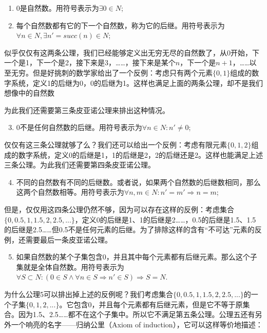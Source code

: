 \documentclass[UTF8]{article}
\begin{document}
\begin{enumerate}
\item 0是自然数。用符号表示为$\exists 0 \in N$;
\item 每个自然数都有它的下一个自然数，称为它的后继。用符号表示为$\forall n \in N, \exists n' = succ(n) \in N$;
\end{enumerate}

似乎仅仅有这两条公理，我们已经能够定义出无穷无尽的自然数了，从0开始，下一个是1，下一个是2，接下来是3，……，接下来是某个$n$，下一个是$n+1$，……以至无穷。但是好挑刺的数学家给出了一个反例：考虑只有两个元素$\{0, 1\}$组成的数字系统，定义1的后继为0，0的后继为1。这样也满足上面的两条公理，却不是我们想像中的自然数

为此我们还需要第三条皮亚诺公理来排出这种情况。

\begin{enumerate}
  \setcounter{enumi}{2}
  \item 0不是任何自然数的后继。用符号表示为$\forall n \in N: n' \neq 0$;
\end{enumerate}

仅仅有这三条公理就够了么？我们还可以给出一个反例：考虑有限元素$\{0, 1, 2\}$组成的数字系统，定义0的后继是1，1的后继是2，2的后继还是2。这样也能满足上述三条公理。为此我们还需要第四条皮亚诺公理。

\begin{enumerate}
  \setcounter{enumi}{3}
  \item 不同的自然数有不同的后继数。或者说，如果两个自然数的后继数相同，那么这两个自然数相等。用符号表示为$\forall n, m \in N: n' = m' \Rightarrow n = m$;
\end{enumerate}

但是，仅仅用这四条公理仍然不够，因为可以存在这样的反例：考虑集合$\{0, 0.5, 1, 1.5, 2, 2.5, ...\}$，定义0的后继是1、1的后继是2……，0.5的后继是1.5、1.5的后继是2.5……但0.5不是任何元素的后继。为了排除这样的含有“不可达”元素的反例，还需要最后一条皮亚诺公理。

\begin{enumerate}
  \setcounter{enumi}{4}
  \item 如果自然数的某个子集包含0，并且其中每个元素都有后继元素。那么这个子集就是全体自然数。用符号表示为$\forall S \subset N: (0 \in S \land \forall n \in S \Rightarrow n' \in S) \Rightarrow S = N$.
\end{enumerate}

为什么公理5可以排出掉上述的反例呢？我们考虑集合$\{0, 0.5, 1, 1.5, 2, 2.5, ...\}$的一个子集$\{0, 1, 2, ...\}$。它包含0，并且每个元素都有后继元素，但是它不等于原集合。因为1.5、2.5……都不在这个子集中。所以它不满足第五条公理。公理五还有另外一个响亮的名字——归纳公里（Axiom of induction），它可以这样等价地描述：
\end{document}
